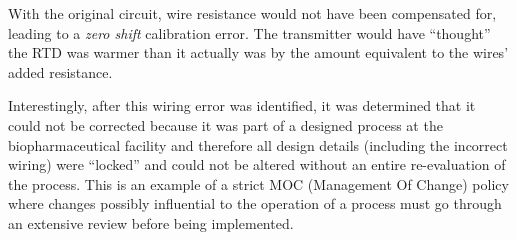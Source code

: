 With the original circuit, wire resistance would not have been compensated for, leading to a {\it zero shift} calibration error.  The transmitter would have ``thought'' the RTD was warmer than it actually was by the amount equivalent to the wires' added resistance.

\vskip 10pt

Interestingly, after this wiring error was identified, it was determined that it could not be corrected because it was part of a designed process at the biopharmaceutical facility and therefore all design details (including the incorrect wiring) were ``locked'' and could not be altered without an entire re-evaluation of the process.  This is an example of a strict MOC (Management Of Change) policy where changes possibly influential to the operation of a process must go through an extensive review before being implemented.



